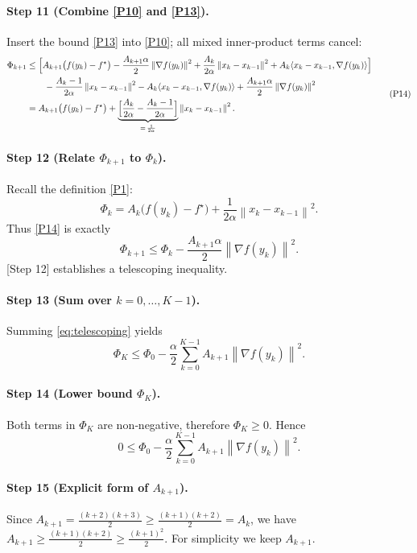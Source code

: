 \documentclass{article}
\newcommand{\norm}[1]{\left\lVert #1\right\rVert}
\begin{document}
\paragraph{Step 11 (Combine \eqref{P10} and \eqref{P13}).}  
Insert the bound \eqref{P13} into \eqref{P10}; all mixed inner‑product terms cancel:
\[
\begin{aligned}
\Phi_{k+1}
&\le \Bigl[A_{k+1}\bigl(f(y_k)-f^\star\bigr)
      -\frac{A_{k+1}\alpha}{2}\norm{\nabla f(y_k)}^{2}
      +\frac{A_k}{2\alpha}\norm{x_k-x_{k-1}}^{2}
      +A_k\langle x_k-x_{k-1},\nabla f(y_k)\rangle\Bigr] \\
&\qquad -\frac{A_k-1}{2\alpha}\norm{x_k-x_{k-1}}^{2}
      -A_k\langle x_k-x_{k-1},\nabla f(y_k)\rangle
      +\frac{A_{k+1}\alpha}{2}\norm{\nabla f(y_k)}^{2}\\
&= A_{k+1}\bigl(f(y_k)-f^\star\bigr)
   +\underbrace{\Bigl[\frac{A_k}{2\alpha}
      -\frac{A_k-1}{2\alpha}\Bigr]}_{=\,\frac{1}{2\alpha}}
      \norm{x_k-x_{k-1}}^{2}.
\end{aligned}
\tag{P14}
\]

\paragraph{Step 12 (Relate $\Phi_{k+1}$ to $\Phi_k$).}  
Recall the definition \eqref{P1}:
\[
\Phi_k = A_k\bigl(f(y_k)-f^\star\bigr)+\frac{1}{2\alpha}\norm{x_k-x_{k-1}}^{2}.
\]
Thus \eqref{P14} is exactly
\[
\Phi_{k+1}\le \Phi_k -\frac{A_{k+1}\alpha}{2}\norm{\nabla f(y_k)}^{2}.
\tag{P15}\label{eq:telescoping}
\]
[Step 12] establishes a telescoping inequality.

\paragraph{Step 13 (Sum over $k=0,\dots,K-1$).}  
Summing \eqref{eq:telescoping} yields
\[
\Phi_K \le \Phi_0 -\frac{\alpha}{2}\sum_{k=0}^{K-1}A_{k+1}\norm{\nabla f(y_k)}^{2}.
\tag{P16}
\]

\paragraph{Step 14 (Lower bound $\Phi_K$).}  
Both terms in $\Phi_K$ are non‑negative, therefore $\Phi_K\ge0$. Hence
\[
0 \le \Phi_0 -\frac{\alpha}{2}\sum_{k=0}^{K-1}A_{k+1}\norm{\nabla f(y_k)}^{2}.
\tag{P17}
\]

\paragraph{Step 15 (Explicit form of $A_{k+1}$).}  
Since $A_{k+1}=\frac{(k+2)(k+3)}{2}\ge \frac{(k+1)(k+2)}{2}=A_k$, we have $A_{k+1}\ge \frac{(k+1)(k+2)}{2}\ge \frac{(k+1)^2}{2}$. For simplicity we keep $A_{k+1}$.
\end{document}
